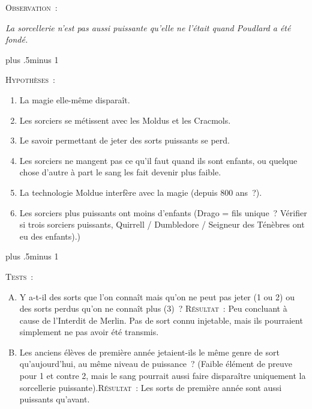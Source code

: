 \begin{centering}
\begin{samepage}
\scshape Observation~:

\itshape La sorcellerie n'est pas aussi puissante qu'elle ne l'était quand Poudlard a été fondé. \end{samepage}

\baselineskip plus .5\textheight minus 1\baselineskip

\begin{samepage}
\scshape Hypothèses~:

\itshape
        \begin{enumerate}[1.]
                \firmlist
                \setlength{\leftmargin}{\parindent}
                \setlength{\rightmargin}{\parindent}
        \item La magie elle-même disparaît.
        \item Les sorciers se métissent avec les Moldus et les Cracmols.
        \item Le savoir permettant de jeter des sorts puissants se perd.
        \item Les sorciers ne mangent pas ce qu'il faut quand ils sont enfants, ou quelque chose d'autre à part le sang les fait devenir plus faible.
        \item La technologie Moldue interfère avec la magie (depuis 800 ans~?).
        \item Les sorciers plus puissants ont moins d'enfants (Drago = fils unique~? Vérifier si trois sorciers puissants, Quirrell / Dumbledore / Seigneur des Ténèbres ont eu des enfants).)
        \end{enumerate}
\end{samepage}

\baselineskip plus .5\textheight minus 1\baselineskip

\begin{samepage}
\scshape Tests~:
\itshape
        \begin{enumerate}[A.]{
                \firmlist
                \setlength{\leftmargin}{\parindent}
                \setlength{\rightmargin}{1cm}}
        \item Y a-t-il des sorts que l'on connaît mais qu'on ne peut pas jeter (1 ou 2) ou des sorts perdus qu'on ne connaît plus (3)~? {\scshape Résultat~:} Peu concluant à cause de l'Interdit de Merlin. Pas de sort connu injetable, mais ils pourraient simplement ne pas avoir été transmis.

        \item Les anciens élèves de première année jetaient-ils le même genre de sort qu'aujourd'hui, au même niveau de puissance~? (Faible élément de preuve pour 1 et contre 2, mais le sang pourrait aussi faire disparaître uniquement la sorcellerie puissante).{\scshape Résultat~:} Les sorts de première année sont aussi puissants qu'avant.


\end{enumerate}
\end{samepage}
\end{centering}
